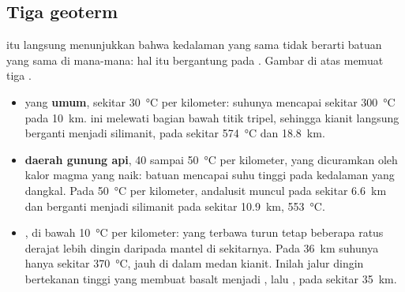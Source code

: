 \subsection{Tiga geoterm}

 itu langsung menunjukkan bahwa kedalaman yang sama tidak
berarti batuan yang sama di mana-mana: hal itu bergantung pada .
Gambar  di atas memuat tiga .

\begin{itemize}
  \item {} yang \textbf{umum}, sekitar \qty{30}{\celsius} per
        kilometer: suhunya mencapai sekitar \qty{300}{\celsius} pada
        \qty{10}{km}.  ini melewati bagian bawah titik tripel, sehingga
        kianit langsung berganti menjadi silimanit, pada sekitar
        \qty{574}{\celsius} dan \qty{18.8}{km}.
  \item {} \textbf{daerah gunung api}, 40 sampai \qty{50}{\celsius} per
        kilometer, yang dicuramkan oleh kalor magma yang naik: batuan mencapai
        suhu tinggi pada kedalaman yang dangkal. Pada \qty{50}{\celsius} per
        kilometer, andalusit muncul pada sekitar \qty{6.6}{km} dan berganti
        menjadi silimanit pada sekitar \qty{10.9}{km}, \qty{553}{\celsius}.
  \item {} \textbf{}, di bawah
        \qty{10}{\celsius} per kilometer:  yang terbawa turun tetap
        beberapa ratus derajat lebih dingin daripada mantel di sekitarnya. Pada
        \qty{36}{km} suhunya hanya sekitar \qty{370}{\celsius}, jauh di dalam
        medan kianit. Inilah jalur dingin bertekanan tinggi yang membuat basalt
        menjadi , lalu , pada sekitar \qty{35}{km}.
\end{itemize}

